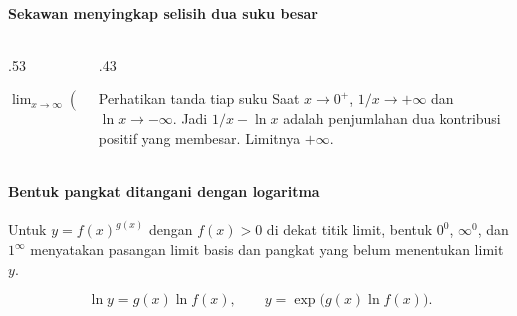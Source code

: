 \documentclass{../../kalkulus-ppt}
\begin{document}
\begin{frame}{\insertsection}
    \framesubtitle{Sekawan menyingkap selisih dua suku besar}
    \begin{columns}[t,onlytextwidth]
        \begin{column}{.53\textwidth}
            \begin{contoh}
                $\displaystyle\lim_{x\to\infty}(\sqrt{x^2+6x}-x)$
            \end{contoh}
        \end{column}
        \begin{column}{.43\textwidth}
            \begin{block}{Perhatikan tanda tiap suku}
                Saat $x\to0^+$, $1/x\to+\infty$ dan $\ln x\to-\infty$.
                Jadi $1/x-\ln x$ adalah penjumlahan dua kontribusi positif
                yang membesar. Limitnya $+\infty$.
            \end{block}
        \end{column}
    \end{columns}
\end{frame}

\begin{frame}{\insertsection}
    \framesubtitle{Bentuk pangkat ditangani dengan logaritma}
    \begin{definisi}
        Untuk $y=f(x)^{g(x)}$ dengan $f(x)>0$ di dekat titik limit,
        bentuk $0^0$, $\infty^0$, dan $1^\infty$ menyatakan pasangan
        limit basis dan pangkat yang belum menentukan limit $y$.
    \end{definisi}
    \[
        \ln y=g(x)\ln f(x),\qquad y=\exp\bigl(g(x)\ln f(x)\bigr).
    \]
\end{frame}
\end{document}
